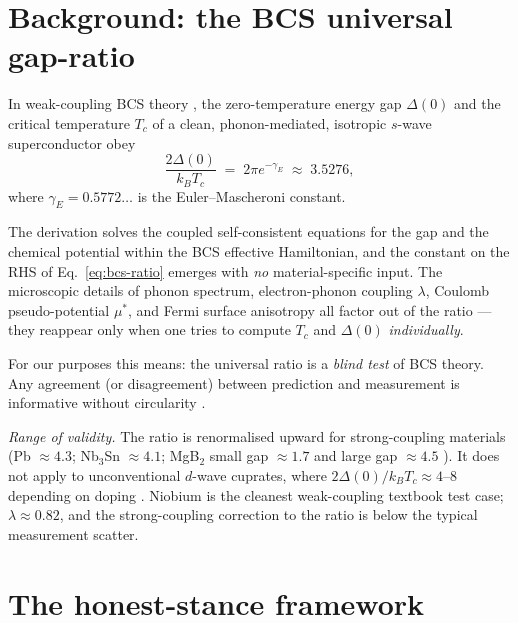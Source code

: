 \documentclass[11pt,a4paper]{article}
\begin{document}
\section{Background: the BCS universal gap-ratio}
\label{sec:bcs}

In weak-coupling BCS theory \cite{bcs1957}, the zero-temperature
energy gap \(\Delta(0)\) and the critical temperature \(T_{c}\) of a
clean, phonon-mediated, isotropic $s$-wave superconductor obey
\begin{equation}
\label{eq:bcs-ratio}
\frac{2\Delta(0)}{k_{B} T_{c}}
\;=\;
2\pi e^{-\gamma_{E}}
\;\approx\;
3.5276,
\end{equation}
where \(\gamma_{E} = 0.5772\ldots\) is the Euler--Mascheroni constant.

The derivation \cite[Ch.~3]{tinkham1996} solves the coupled
self-consistent equations for the gap and the chemical potential
within the BCS effective Hamiltonian, and the constant on the RHS of
Eq.~\eqref{eq:bcs-ratio} emerges with \emph{no} material-specific
input. The microscopic details of phonon spectrum, electron-phonon
coupling \(\lambda\), Coulomb pseudo-potential \(\mu^{*}\), and Fermi
surface anisotropy all factor out of the ratio --- they reappear only
when one tries to compute \(T_{c}\) and \(\Delta(0)\) \emph{individually}.

For our purposes this means: the universal ratio is a \emph{blind
test} of BCS theory. Any agreement (or disagreement) between
prediction and measurement is informative without circularity
\cite[Ch.~4 \S 3]{poole2007handbook}.

\medskip
\noindent\emph{Range of validity.} The ratio is renormalised upward
for strong-coupling materials (Pb \(\approx 4.3\); Nb$_3$Sn \(\approx 4.1\);
MgB$_2$ small gap \(\approx 1.7\) and large gap \(\approx 4.5\)
\cite{souma2003mgb2_arpes}). It does not apply to unconventional
$d$-wave cuprates, where \(2\Delta(0)/k_{B}T_{c} \approx 4\text{--}8\)
depending on doping \cite{damascelli2003cuprates}.
Niobium is the cleanest weak-coupling textbook test case;
\(\lambda \approx 0.82\), and the strong-coupling correction to the
ratio is below the typical measurement scatter.

\section{The honest-stance framework}
\label{sec:framework}
\end{document}
